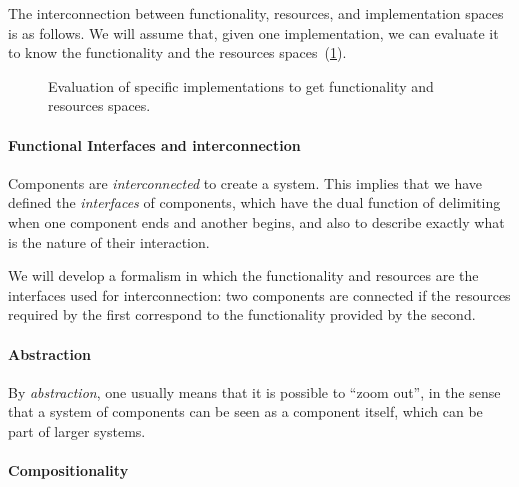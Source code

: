 The interconnection between functionality, resources, and implementation spaces
is as follows. We will assume that, given one implementation, we can evaluate it
to know the functionality and the resources spaces~(\cref{fig:FIR}).

\begin{figure}[h!]
    \centering
    \caption{Evaluation of specific implementations to get functionality and resources spaces.\label{fig:FIR}}
\end{figure}
 


\paragraph{Functional Interfaces and interconnection}

Components are \emph{interconnected} to create a system.
This implies that we have defined the \emph{interfaces} of components, which
have the dual function of delimiting when one component ends and another begins,
and also to describe exactly what is the nature of their interaction.

We will develop  a formalism in which the functionality and resources
are the interfaces used for interconnection: two components are connected
if the resources required by the first correspond to the functionality
provided by the second.


\paragraph{Abstraction}

By \emph{abstraction}, one usually means that it is possible to ``zoom out'',
in the sense that a system of components can be seen as a component itself,
which can be part of larger systems.



\paragraph{Compositionality}

